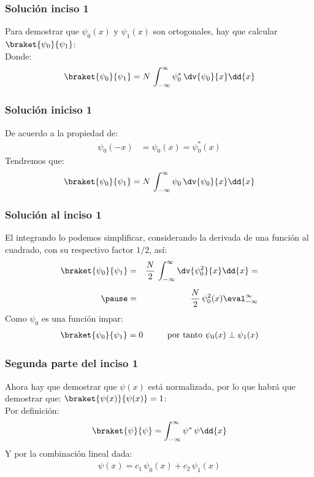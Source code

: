 \begin{frame}
\frametitle{Solución inciso 1}
Para demostrar que $\psi_{0}(x)$ y $\psi_{1}(x)$ son ortogonales, hay que calcular $\braket{\psi_{0}}{\psi_{1}}$:
\\
\bigskip
\pause
Donde:
\begin{align*}
\braket{\psi_{0}}{\psi_{1}} = N \, \int_{-\infty}^{\infty} \psi_{0}^{*} \, \dv{\psi_{0}}{x} \dd{x}
\end{align*}
\end{frame}
\begin{frame}
\frametitle{Solución iniciso 1}
De acuerdo a la propiedad de:
\begin{align*}
\psi_{0}(-x) &= \psi_{0}(x) = \psi_{0}^{*} (x)
\end{align*}
\pause
Tendremos que:
\begin{align*}
\braket{\psi_{0}}{\psi_{1}} = N \, \int_{-\infty}^{\infty} \psi_{0} \, \dv{\psi_{0}}{x} \dd{x}
\end{align*}
\end{frame}
\begin{frame}
\frametitle{Solución al inciso 1}
El integrando lo podemos simplificar, considerando la derivada de una función al cuadrado, con su respectivo factor $1/2$, así:
\begin{eqnarray*}
\braket{\psi_{0}}{\psi_{1}} &=& \dfrac{N}{2} \, \int_{-\infty}^{\infty} \dv{\psi_{0}^{2}}{x} \dd{x} = \\[0.5em] \pause
&=& \dfrac{N}{2} \, \psi_{0}^{2} (x) \eval_{-\infty}^{\infty}
\end{eqnarray*}
\pause
Como $\psi_{0}$ es una función impar:
\begin{align*}
\braket{\psi_{0}}{\psi_{1}} = 0 \hspace{1cm} \mbox{por tanto } \psi_{0}(x) \perp \psi_{1}(x)
\end{align*}
\end{frame}
\begin{frame}
\frametitle{Segunda parte del inciso 1}
Ahora hay que demostrar que $\psi(x)$ está normalizada, por lo que habrá que demostrar que: $\braket{\psi(x)}{\psi(x)} = 1$:
\\
\bigskip
\pause
Por definición:
\begin{align*}
\braket{\psi}{\psi} = \int_{-\infty}^{\infty} \psi^{*} \, \psi \dd{x}
\end{align*}
\pause
Y por la combinación lineal dada:
\begin{align*}
\psi(x) = c_{1} \, \psi_{0}(x) + c_{2} \, \psi_{1} (x)
\end{align*}
\end{frame}
